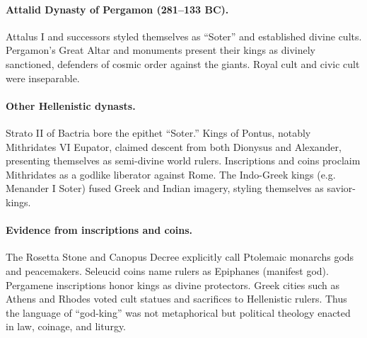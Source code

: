 \paragraph{Attalid Dynasty of Pergamon (281–133 BC).}
Attalus I and successors styled themselves as “Soter” and established divine cults.
Pergamon’s Great Altar and monuments present their kings as divinely sanctioned, defenders of cosmic order against the giants.
Royal cult and civic cult were inseparable.

\paragraph{Other Hellenistic dynasts.}
Strato II of Bactria bore the epithet “Soter.”
Kings of Pontus, notably Mithridates VI Eupator, claimed descent from both Dionysus and Alexander, presenting themselves as semi-divine world rulers.
Inscriptions and coins proclaim Mithridates as a godlike liberator against Rome.
The Indo-Greek kings (e.g. Menander I Soter) fused Greek and Indian imagery, styling themselves as savior-kings.

\paragraph{Evidence from inscriptions and coins.}
The Rosetta Stone and Canopus Decree explicitly call Ptolemaic monarchs gods and peacemakers.
Seleucid coins name rulers as Epiphanes (manifest god).
Pergamene inscriptions honor kings as divine protectors.
Greek cities such as Athens and Rhodes voted cult statues and sacrifices to Hellenistic rulers.
Thus the language of “god-king” was not metaphorical but political theology enacted in law, coinage, and liturgy.

